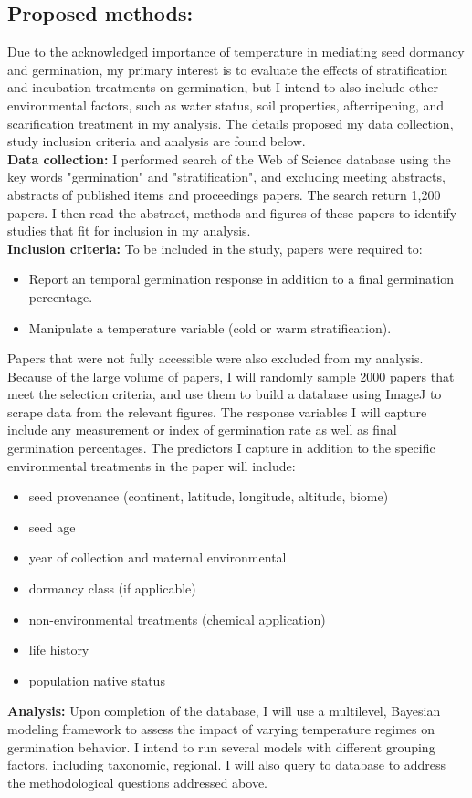 \documentclass{article}\usepackage[]{graphicx}\usepackage[]{color}
\begin{document}
\subsection*{Proposed methods:}
\indent\indent Due to the acknowledged importance of temperature in mediating seed dormancy and germination, my primary interest is to evaluate the effects of stratification and incubation treatments on germination, but I intend to also include other environmental factors, such as water status, soil properties, afterripening, and scarification treatment in my analysis. The details proposed my data collection, study inclusion criteria and analysis are found below.\\
\indent\textbf{Data collection:} I performed search of the Web of Science database using the key words "germination" and "stratification", and excluding meeting abstracts, abstracts of published items and proceedings papers. The search return 1,200 papers. I then read the abstract, methods and figures of these papers to identify studies that fit for inclusion in my analysis.\\
\indent\textbf{Inclusion criteria:} To be included in the study, papers were required to:
\begin{itemize}
\item Report an temporal germination response in addition to a final germination percentage.
\item Manipulate a temperature variable (cold or warm stratification).
\end{itemize}
\par Papers that were not fully accessible were also excluded from my analysis. Because of the large volume of papers, I will randomly sample 2000 papers that meet the selection criteria, and use them to build a database using ImageJ to scrape data from the relevant figures. The response variables I will capture include any measurement or index of germination rate as well as final germination percentages. The predictors I capture in addition to the specific environmental treatments in the paper will include:
\begin{itemize}
\item seed provenance (continent, latitude, longitude, altitude, biome)
\item seed age
\item year of collection and maternal environmental
\item dormancy class (if applicable)
\item non-environmental treatments (chemical application)
\item life history
\item population native status
\end{itemize}
\indent\indent\textbf{Analysis:} Upon completion of the database, I will use a multilevel, Bayesian modeling framework to assess the impact of varying temperature regimes on germination behavior. I intend to run several models with different grouping factors, including taxonomic, regional. I will also query to database to address the methodological questions addressed above.
\end{document}

